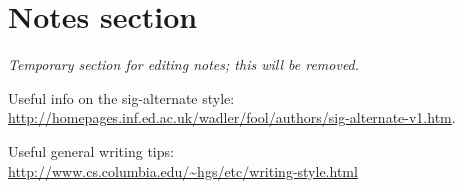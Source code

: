 \section{Notes section}

\emph{Temporary section for editing notes; this will be removed.}

Useful info on the sig-alternate style: \\
\url{http://homepages.inf.ed.ac.uk/wadler/fool/authors/sig-alternate-v1.htm}.

Useful general writing tips: \\
\url{http://www.cs.columbia.edu/~hgs/etc/writing-style.html}
